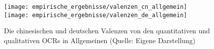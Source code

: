 \begin{figure}[htb]
    \minipage{\textwidth}
    \texttt{[image: empirische\_ergebnisse/valenzen\_cn\_allgemein]}
    \endminipage\hfill
    \minipage{\textwidth}
    \texttt{[image: empirische\_ergebnisse/valenzen\_de\_allgemein]}
    \endminipage 
    \caption[Die chinesischen und deutschen Valenzen von den quantitativen und qualitativen OCRs in Allgemeinen]{Die chinesischen und deutschen Valenzen von den quantitativen und qualitativen \ac{OCRs} in Allgemeinen (Quelle: Eigene Darstellung)}
    \label{fig:valenzen_de_cn_allgemein}
\end{figure}



